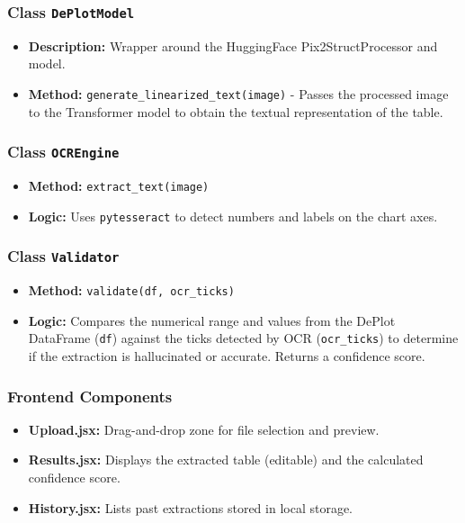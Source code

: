 \documentclass[12pt, a4paper]{article}
\begin{document}
\subsubsection{Class \texttt{DePlotModel}}
\begin{itemize}
    \item \textbf{Description:} Wrapper around the HuggingFace Pix2StructProcessor and model.
    \item \textbf{Method:} \texttt{generate\_linearized\_text(image)} - Passes the processed image to the Transformer model to obtain the textual representation of the table.
\end{itemize}

\subsubsection{Class \texttt{OCREngine}}
\begin{itemize}
    \item \textbf{Method:} \texttt{extract\_text(image)}
    \item \textbf{Logic:} Uses \texttt{pytesseract} to detect numbers and labels on the chart axes.
\end{itemize}

\subsubsection{Class \texttt{Validator}}
\begin{itemize}
    \item \textbf{Method:} \texttt{validate(df, ocr\_ticks)}
    \item \textbf{Logic:} Compares the numerical range and values from the DePlot DataFrame (\texttt{df}) against the ticks detected by OCR (\texttt{ocr\_ticks}) to determine if the extraction is hallucinated or accurate. Returns a confidence score.
\end{itemize}

\subsubsection{Frontend Components}
\begin{itemize}
    \item \textbf{Upload.jsx:} Drag-and-drop zone for file selection and preview.
    \item \textbf{Results.jsx:} Displays the extracted table (editable) and the calculated confidence score.
    \item \textbf{History.jsx:} Lists past extractions stored in local storage.
\end{itemize}
\end{document}

